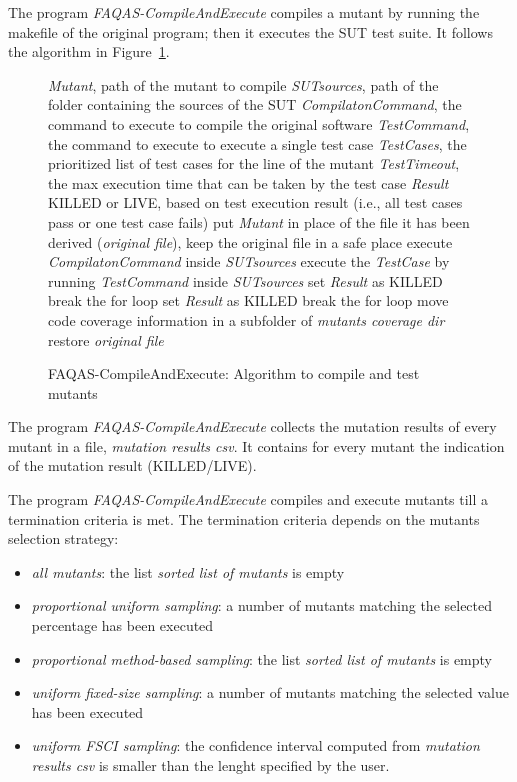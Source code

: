 \RQ{} The program \emph{FAQAS-CompileAndExecute} compiles a mutant by running the makefile of the original program; then it executes the SUT test suite. It follows the algorithm in Figure~\ref{alg:compileAndExecute}.


\begin{figure}[h]
\begin{algorithmic}[1]
\scriptsize
\Require \emph{Mutant}, path of the mutant to compile
\Require \emph{SUTsources}, path of the folder containing the sources of the SUT
\Require \emph{CompilatonCommand}, the command to execute to compile the original software
\Require \emph{TestCommand}, the command to execute to execute a single test case
\Require \emph{TestCases}, the prioritized list of test cases for the line of the mutant
\Require \emph{TestTimeout}, the max execution time that can be taken by the test case
\Ensure \emph{Result} KILLED or LIVE, based on test execution result (i.e., all test cases pass or one test case fails)
\State put \emph{Mutant} in place of the file it has been derived (\emph{original file}), keep the original file in a safe place
\State execute  \emph{CompilatonCommand} inside \emph{SUTsources}
\State execute the \emph{TestCase} by running \emph{TestCommand} inside \emph{SUTsources}
\State set \emph{Result} as KILLED
\State break the for loop
\EndIf
{}
\State set \emph{Result} as KILLED
\State break the for loop
\EndIf
\EndFor
\State move code coverage information in a subfolder of \emph{mutants coverage dir}
\State restore \emph{original file}
\end{algorithmic}
\caption{FAQAS-CompileAndExecute: Algorithm to compile and test mutants}
\label{alg:compileAndExecute}
\end{figure}

\RQ{} The program \emph{FAQAS-CompileAndExecute} collects the mutation results of every mutant in a file, \emph{mutation results csv}. It contains for every mutant the indication of the mutation result (KILLED/LIVE).

\RQ{} The program \emph{FAQAS-CompileAndExecute} compiles and execute mutants till a termination criteria is met. The termination criteria depends on the mutants selection strategy:
\begin{itemize}
\item \emph{all mutants}: the list \emph{sorted list of mutants} is empty
\item \emph{proportional uniform sampling}: a number of mutants matching the selected percentage has been executed
\item \emph{proportional method-based sampling}: the list \emph{sorted list of mutants} is empty
\item \emph{uniform fixed-size sampling}: a number of mutants matching the selected value has been executed
\item \emph{uniform FSCI sampling}: the confidence interval computed from \emph{mutation results csv} is smaller than the lenght specified by the user.
\end{itemize}

